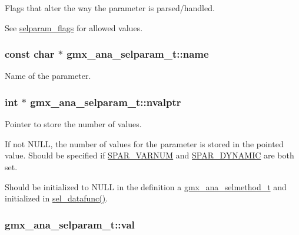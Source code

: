 \-Flags that alter the way the parameter is parsed/handled. 

\-See \hyperlink{share_2template_2gromacs_2selparam_8h_selparam_flags}{selparam\-\_\-flags} for allowed values. \hypertarget{structgmx__ana__selparam__t_ad1426fc1afc601e3212493a6cb00ea4d}{
\subsubsection[{name}]{\setlength{\rightskip}{0pt plus 5cm}const char $\ast$ {\bf gmx\-\_\-ana\-\_\-selparam\-\_\-t\-::name}}}\label{structgmx__ana__selparam__t_ad1426fc1afc601e3212493a6cb00ea4d}
\-Name of the parameter. \hypertarget{structgmx__ana__selparam__t_a727a1b2415611c5506aa763f0256b76d}{
\subsubsection[{nvalptr}]{\setlength{\rightskip}{0pt plus 5cm}int $\ast$ {\bf gmx\-\_\-ana\-\_\-selparam\-\_\-t\-::nvalptr}}}\label{structgmx__ana__selparam__t_a727a1b2415611c5506aa763f0256b76d}


\-Pointer to store the number of values. 

\-If not \-N\-U\-L\-L, the number of values for the parameter is stored in the pointed value. \-Should be specified if \hyperlink{share_2template_2gromacs_2selparam_8h_a400330277d7e17cdfef1610cc37838ea}{\-S\-P\-A\-R\-\_\-\-V\-A\-R\-N\-U\-M} and \hyperlink{share_2template_2gromacs_2selparam_8h_ae44a94b4d013d2a344cfb3a9f8c5479f}{\-S\-P\-A\-R\-\_\-\-D\-Y\-N\-A\-M\-I\-C} are both set.

\-Should be initialized to \-N\-U\-L\-L in the definition a {\ttfamily \hyperlink{structgmx__ana__selmethod__t}{gmx\-\_\-ana\-\_\-selmethod\-\_\-t}} and initialized in \hyperlink{include_2selmethod_8h_a5acbf2d7bead71c4d96f9e69b267df56}{sel\-\_\-datafunc()}. \hypertarget{structgmx__ana__selparam__t_a1a2ccba901e24c9c8e2c00c2b61b24d2}{
\subsubsection[{val}]{ {\bf gmx\-\_\-ana\-\_\-selparam\-\_\-t\-::val}}}\label{structgmx__ana__selparam__t_a1a2ccba901e24c9c8e2c00c2b61b24d2}


